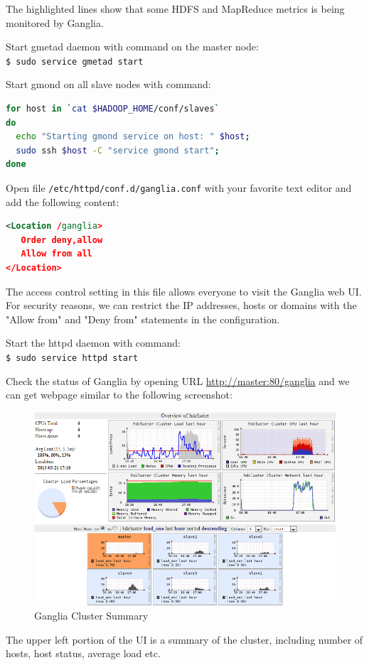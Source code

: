 The highlighted lines show that some HDFS and MapReduce metrics is being monitored by Ganglia.

Start gmetad daemon with command on the master node: \\
\verb|$ sudo service gmetad start|

Start gmond on all slave nodes with command: 
\lstset{style=bashstyle}
\begin{lstlisting}[language=bash]
for host in `cat $HADOOP_HOME/conf/slaves`
do
  echo "Starting gmond service on host: " $host;
  sudo ssh $host -C "service gmond start";
done
\end{lstlisting}

Open file \verb|/etc/httpd/conf.d/ganglia.conf| with your favorite text editor and add the following content: 
\lstset{style=bashstyle}
\begin{lstlisting}[language=XML]
<Location /ganglia>
   Order deny,allow
   Allow from all
</Location>
\end{lstlisting}

The access control setting in this file allows everyone to visit the Ganglia web UI. For security reasons, we can restrict the IP addresses, hosts or domains with the "Allow from" and "Deny from" statements in the configuration.

Start the httpd daemon with command: \\
\verb|$ sudo service httpd start|

Check the status of Ganglia by opening URL \url{http://master:80/ganglia} and we can get webpage similar to the following screenshot:
\begin{figure}[ht]
  \centering
  \includegraphics[width=.90\textwidth]{figs/5163os_06_06.png}
  \caption{Ganglia Cluster Summary}\label{fig:ganglia.cluster.summary}
\end{figure} 
The upper left portion of the UI is a summary of the cluster, including number of hosts, host status, average load etc.

